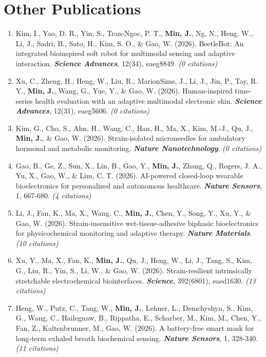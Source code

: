 \documentclass[11pt,a4paper]{article}
\begin{document}
\section{Other Publications}
\begin{enumerate}[leftmargin=*, itemsep=3pt, parsep=0pt, topsep=2pt]
  \item Kim, I., Yao, D. R., Yin, S., Tran-Ngoc, P. T., \textbf{Min, J.}, Ng, N., Heng, W., Li, J., Sadri, B., Sato, H., Kim, S. O., \& Gao, W. (2026). BeetleBot: An integrated bioinspired soft robot for multimodal sensing and adaptive interaction. \textbf{\textit{Science Advances}}, 12(34), eaeg8849. \textit{(0 citations)}
  \item Xu, C., Zheng, H., Heng, W., Liu, R., MarionSims, J., Li, J., Jin, P., Tay, R. Y., \textbf{Min, J.}, Wang, G., Yue, Y., \& Gao, W. (2026). Human-inspired time-series health evaluation with an adaptive multimodal electronic skin. \textbf{\textit{Science Advances}}, 12(31), eaeg5606. \textit{(0 citations)}
  \item Kim, G., Cho, S., Ahn, H., Wang, C., Han, H., Ma, X., Kim, M.-J., Qu, J., \textbf{Min, J.}, \& Gao, W. (2026). Strain-isolated microneedles for ambulatory hormonal and metabolic monitoring. \textbf{\textit{Nature Nanotechnology}}. \textit{(0 citations)}
  \item Gao, B., Ge, Z., Sun, X., Lin, B., Gao, Y., \textbf{Min, J.}, Zhang, Q., Rogers, J. A., Yu, X., Gao, W., \& Lim, C. T. (2026). AI-powered closed-loop wearable bioelectronics for personalized and autonomous healthcare. \textbf{\textit{Nature Sensors}}, 1, 667-680. \textit{(4 citations)}
  \item Li, J., Fan, K., Ma, X., Wang, C., \textbf{Min, J.}, Chen, Y., Song, Y., Xu, Y., \& Gao, W. (2026). Strain-insensitive wet-tissue-adhesive biphasic bioelectronics for physicochemical monitoring and adaptive therapy. \textbf{\textit{Nature Materials}}. \textit{(10 citations)}
  \item Xu, Y., Ma, X., Fan, K., \textbf{Min, J.}, Qu, J., Heng, W., Li, J., Tang, S., Kim, G., Liu, R., Yin, S., Li, W., \& Gao, W. (2026). Strain-resilient intrinsically stretchable electrochemical biointerfaces. \textbf{\textit{Science}}, 392(6801), eaed1630. \textit{(13 citations)}
  \item Heng, W., Putz, C., Tang, W., \textbf{Min, J.}, Lehner, L., Demchyshyn, S., Kim, G., Wang, C., Hailegnaw, B., Rippatha, E., Scharber, M., Kim, M., Chen, Y., Fan, Z., Kaltenbrunner, M., Gao, W. (2026). A battery-free smart mask for long-term exhaled breath biochemical sensing. \textbf{\textit{Nature Sensors}}, 1, 328-340. \textit{(11 citations)}

\end{enumerate}
\end{document}
